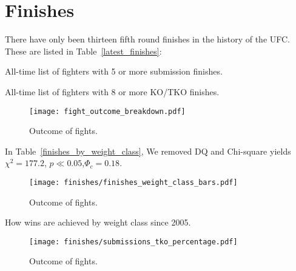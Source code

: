 \clearpage
\section*{Finishes}

There have only been thirteen fifth round finishes in the history of the UFC.
These are listed in Table~\ref{latest_finishes}:

\begin{center}
\begin{table}[h]

\caption{All-time list of fighters with 5 or more submission finishes.}
\end{table}
\end{center}

\begin{center}
\begin{table}[h]

\caption{All-time list of fighters with 8 or more KO/TKO finishes.}
\end{table}
\end{center}

\begin{figure}[h]
\begin{center}
\texttt{[image: fight\_outcome\_breakdown.pdf]}
\caption{Outcome of fights.}
\end{center}
\end{figure}

In Table~\ref{finishes_by_weight_class}, We removed DQ and Chi-square yields $\chi^2=177.2$, $p\ll0.05$,$\Phi_c=0.18$.

\begin{figure}[h]
\begin{center}
\texttt{[image: finishes/finishes\_weight\_class\_bars.pdf]}
\caption{Outcome of fights.}
\label{finishes_weight_class_bars}
\end{center}
\end{figure}

\begin{center}
\begin{table}[h]

\caption{How wins are achieved by weight class since 2005.}
\label{finishes_by_weight_class}
\end{table}
\end{center}

\begin{figure}[h]
\begin{center}
\texttt{[image: finishes/submissions\_tko\_percentage.pdf]}
\caption{Outcome of fights.}
\label{submissions_tko_percentage}
\end{center}
\end{figure}

